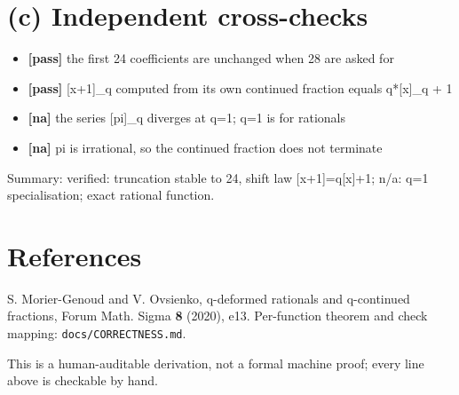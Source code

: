 \documentclass[11pt]{article}
\begin{document}
\section*{(c) Independent cross-checks}
\begin{itemize}
\item \textbf{[pass]} the first 24 coefficients are unchanged when 28 are asked for
\item \textbf{[pass]} [x+1]\_q computed from its own continued fraction equals q*[x]\_q + 1
\item \textbf{[na]} the series [pi]\_q diverges at q=1; q=1 is for rationals
\item \textbf{[na]} pi is irrational, so the continued fraction does not terminate
\end{itemize}
Summary: verified: truncation stable to 24, shift law [x+1]=q[x]+1; n/a: q=1 specialisation; exact rational function.

\section*{References}
S. Morier-Genoud and V. Ovsienko, q-deformed rationals and q-continued
fractions, Forum Math. Sigma \textbf{8} (2020), e13. Per-function theorem and
check mapping: \texttt{docs/CORRECTNESS.md}.

\medskip
\noindent This is a human-auditable derivation, not a formal machine proof;
every line above is checkable by hand.
\end{document}
